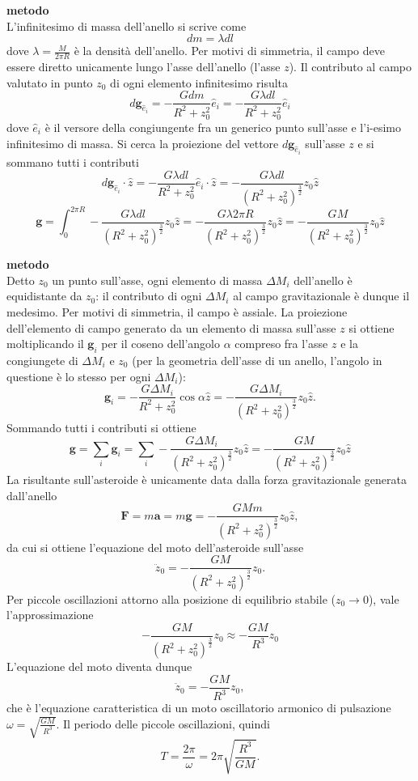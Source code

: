 \documentclass[a4paper,12pt]{article}
\begin{document}
\noindent
\textbf{ metodo} \\
L'infinitesimo di massa dell'anello si scrive come
\[
dm = \lambda dl \tag{18.0}
\]
dove $\lambda = \frac{M}{2\pi R}$ è la densità dell'anello. Per motivi di simmetria, il campo deve essere diretto unicamente lungo l'asse dell'anello (l'asse $z$). Il contributo al campo valutato in punto $z_0$ di ogni elemento infinitesimo risulta
\[
d\mathbf{g}_{\hat{e}_i}= -\frac{Gdm}{R^2+z_0^2}\hat{e}_i = -\frac{G\lambda dl}{R^2+z_0^2}\hat{e}_i \tag{18.1}
\]
dove $\hat{e}_i$ è il versore della congiungente fra un generico punto sull'asse e l'i-esimo infinitesimo di massa. Si cerca la proiezione del vettore $d\mathbf{g}_{\hat{e}_i}$ sull'asse $z$ e si sommano tutti i contributi
\[
d\mathbf{g}_{\hat{e}_i} \cdot \hat{z} = -\frac{G\lambda dl}{R^2+z_0^2}\hat{e}_i \cdot \hat{z} = -\frac{G\lambda dl}{(R^2+z_0^2)^{\frac{3}{2}}}z_0\hat{z} \tag{18.2}
\]
\[
 \mathbf{g} = \int_0^{2\pi R} -\frac{G\lambda dl}{(R^2+z_0^2)^{\frac{3}{2}}}z_0\hat{z} = -\frac{G\lambda 2\pi R}{(R^2+z_0^2)^{\frac{3}{2}}}z_0\hat{z} = -\frac{GM}{(R^2+z_0^2)^{\frac{3}{2}}}z_0\hat{z} \tag{18.3}
\]

\noindent
\textbf{ metodo} \\
Detto $z_0$ un punto sull'asse, ogni elemento di massa $\Delta M_i$ dell'anello è equidistante da $z_0$: il contributo di ogni $\Delta M_i$ al campo gravitazionale è dunque il medesimo. Per motivi di simmetria, il campo è assiale. La proiezione dell'elemento di campo generato da un elemento di massa sull'asse $z$ si ottiene moltiplicando il $ \mathbf{g}_i$ per il coseno dell'angolo $\alpha$ compreso fra l'asse $z$ e la congiungete di $\Delta M_i$ e $z_0$ (per la geometria dell'asse di un anello, l'angolo in questione è lo stesso per ogni $\Delta M_i$):
\[
 \mathbf{g}_i = -\frac{G\Delta M_i}{R^2+z_0^2}\cos\alpha \hat{z} = -\frac{G\Delta M_i}{(R^2+z_0^2)^{\frac{3}{2}}}z_0\hat{z}. \tag{18.4}
\]
Sommando tutti i contributi si ottiene
\[
\mathbf{g} = \sum_i  \mathbf{g}_i = \sum_i -\frac{G\Delta M_i}{(R^2+z_0^2)^{\frac{3}{2}}}z_0\hat{z} = -\frac{GM}{(R^2+z_0^2)^{\frac{3}{2}}}z_0\hat{z} \tag{18.5}
\]
La risultante sull'asteroide è unicamente data dalla forza gravitazionale generata dall'anello
\[
\mathbf{F} = m\mathbf{a} = m\mathbf{g} = -\frac{GMm}{(R^2+z_0^2)^{\frac{3}{2}}}z_0\hat{z}, \tag{18.6}
\]
da cui si ottiene l'equazione del moto dell'asteroide sull'asse
\[
 \ddot{z}_0 = -\frac{GM}{(R^2+z_0^2)^{\frac{3}{2}}}z_0.  \tag{18.7}
\]
Per piccole oscillazioni attorno alla posizione di equilibrio stabile ($z_0 \rightarrow 0$), vale l'approssimazione 
\[
-\frac{GM}{(R^2+z_0^2)^{\frac{3}{2}}}z_0 \approx -\frac{GM}{R^3}z_0 \tag{18.8}
\]
L'equazione del moto diventa dunque
\[
\ddot{z}_0 = -\frac{GM}{R^3}z_0, \tag{18.9}
\]
che è l'equazione caratteristica di un moto oscillatorio armonico di pulsazione $\omega = \sqrt{\frac{GM}{R^3}}$. Il periodo delle piccole oscillazioni, quindi
\[
T = \frac{2\pi}{\omega} = 2\pi \sqrt{\frac{R^3}{GM}}. \tag{18.10}
\]
\end{document}
